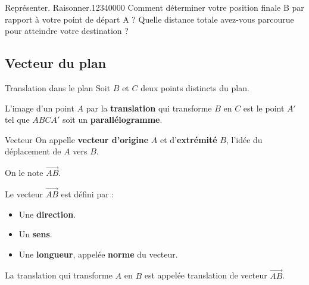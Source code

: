 {\begin{ExoDec}{Représenter. Raisonner.}{1234}{0}{0}{0}{0}
Comment déterminer votre position finale B par rapport à votre point de départ A ? Quelle distance totale avez-vous parcourue pour atteindre votre destination ?\end{ExoDec}
}


\begin{pageCours} %


\section{Vecteur du plan}

\begin{DefT}{Translation dans le plan}
Soit $B$ et $C$ deux points distincts du plan.

L'image d'un point $A$ par la \textbf{translation} qui transforme $B$ en $C$ est le point $A'$ tel que $ABCA'$ soit un \textbf{parallélogramme}. 
\end{DefT}

\begin{DefT}{Vecteur}
On appelle \textbf{vecteur d'origine} $A$ et d'\textbf{extrémité} $B$, l'idée du déplacement de $A$ vers $B$.  

On le note $\vec{AB}$.

Le vecteur $\vec{AB}$ est défini par :
\begin{itemize}
\item Une \textbf{direction}.
\item Un \textbf{sens}.
\item Une \textbf{longueur}, appelée \textbf{norme} du vecteur.
\end{itemize}

La translation qui transforme $A$ en $B$ est appelée translation de vecteur $\vec{AB}$.
\end{DefT}



\end{pageCours}

